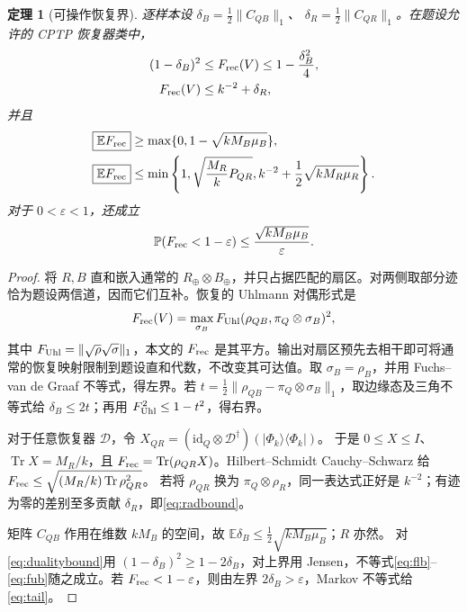 \documentclass[UTF8,a4paper,11pt]{ctexart}
\newtheorem{theorem}{定理}
\DeclareMathOperator{\Tr}{Tr}
\newcommand{\EE}{\mathbb E}
\newcommand{\Prob}{\mathbb P}
\newcommand{\id}{\mathrm{id}}
\begin{document}
\begin{theorem}[可操作恢复界]\label{thm:fidelity}
逐样本设 $\delta_B=\tfrac12\|C_{QB}\|_1$、
$\delta_R=\tfrac12\|C_{QR}\|_1$。在题设允许的 CPTP 恢复器类中，
\begin{align}
 (1-\delta_B)^2&\leq F_{\rm rec}(V)
 \leq1-\frac{\delta_B^2}{4},\label{eq:dualitybound}\\
 F_{\rm rec}(V)&\leq k^{-2}+\delta_R,\label{eq:radbound}
\end{align}
并且
\begin{align}
 \boxed{\EE F_{\rm rec}}
 &\geq\max\{0,1-\sqrt{kM_B\mu_B}\},\label{eq:flb}\\
 \boxed{\EE F_{\rm rec}}
 &\leq\min\left\{1,\sqrt{\frac{M_R}{k}P_{QR}},
 k^{-2}+\frac12\sqrt{kM_R\mu_R}\right\}.\label{eq:fub}
\end{align}
对于 $0<\varepsilon<1$，还成立
\begin{equation}\label{eq:tail}
 \Prob(F_{\rm rec}<1-\varepsilon)
 \leq\frac{\sqrt{kM_B\mu_B}}{\varepsilon}.
\end{equation}
\end{theorem}
\begin{proof}
将 $R,B$ 直和嵌入通常的 $R_{\oplus}\otimes B_{\oplus}$，并只占据匹配的扇区。对两侧取部分迹恰为题设两信道，因而它们互补。恢复的 Uhlmann 对偶形式\cite{KRS,KSW}是
\begin{equation*}
 F_{\rm rec}(V)=\max_{\sigma_B}
 F_{\rm Uhl}(\rho_{QB},\pi_Q\otimes\sigma_B)^2,
\end{equation*}
其中 $F_{\rm Uhl}=\|\sqrt\rho\sqrt\sigma\|_1$，本文的 $F_{\rm rec}$ 是其平方。输出对扇区预先去相干即可将通常的恢复映射限制到题设直和代数，不改变其可达值。取 $\sigma_B=\rho_B$，并用 Fuchs--van de Graaf 不等式，得左界。若
$t=\tfrac12\|\rho_{QB}-\pi_Q\otimes\sigma_B\|_1$，取边缘态及三角不等式给 $\delta_B\leq2t$；再用 $F_{\rm Uhl}^2\leq1-t^2$，得右界。

对于任意恢复器 $\mathcal D$，令
$X_{QR}=(\id_Q\otimes\mathcal D^\dagger)(|\Phi_k\rangle\langle\Phi_k|)$。
于是 $0\leq X\leq I$、$\Tr X=M_R/k$，且
$F_{\rm rec}=\Tr(\rho_{QR}X)$。Hilbert--Schmidt Cauchy--Schwarz 给
$F_{\rm rec}\leq\sqrt{(M_R/k)\Tr\rho_{QR}^2}$。
若将 $\rho_{QR}$ 换为 $\pi_Q\otimes\rho_R$，同一表达式正好是 $k^{-2}$；有迹为零的差别至多贡献 $\delta_R$，即\eqref{eq:radbound}。

矩阵 $C_{QB}$ 作用在维数 $kM_B$ 的空间，故
$\EE\delta_B\leq\tfrac12\sqrt{kM_B\mu_B}$；$R$ 亦然。
对\eqref{eq:dualitybound}用 $(1-\delta_B)^2\geq1-2\delta_B$，对上界用 Jensen，不等式\eqref{eq:flb}--\eqref{eq:fub}随之成立。若 $F_{\rm rec}<1-\varepsilon$，则由左界 $2\delta_B>\varepsilon$，Markov 不等式给\eqref{eq:tail}。
\end{proof}
\end{document}
